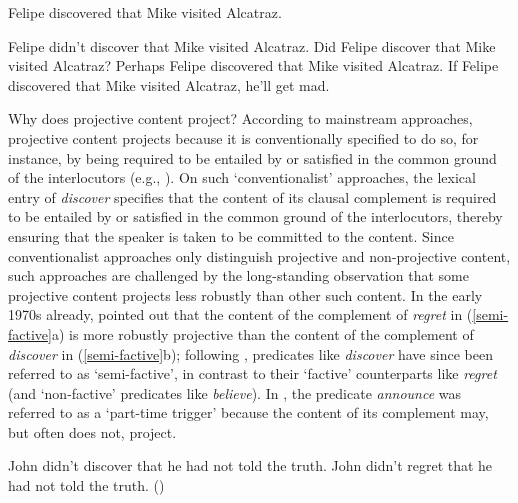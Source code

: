 \documentclass[11pt,fleqn]{article}
\newcommand{\6}{\mbox{$[\hspace*{-.6mm}[$}}
\newcommand{\9}{\mbox{$]\hspace*{-.6mm}]$}}
\begin{document}
\begin{exe}
\ex\label{eng1}  Felipe discovered that Mike visited Alcatraz.

\ex\label{eng2}
\begin{xlist} 
\ex Felipe didn't discover that Mike visited Alcatraz.
\ex Did Felipe discover that Mike visited Alcatraz?
\ex Perhaps Felipe discovered that Mike visited Alcatraz.
\ex If Felipe discovered that Mike visited Alcatraz, he'll get mad.
\end{xlist}
\end{exe}

Why does projective content project? According to mainstream approaches, projective content projects because it is conventionally specified to do so, for instance, by being required to be entailed by or satisfied in the common ground of the interlocutors (e.g., \citealt{heim83,vds92,geurts99}). On such `conventionalist' approaches, the lexical entry of {\em discover} specifies that the content of its clausal complement is required to be entailed by or satisfied in the common ground of the interlocutors, thereby ensuring that the speaker is taken to be committed to the content. Since conventionalist approaches only distinguish projective and non-projective content, such approaches are challenged by the long-standing observation that some projective content projects less robustly than other such content. In the early 1970s already, \citet{karttunen71b} pointed out that the content of the complement of {\em regret} in (\ref{semi-factive}a) is more robustly projective than the content of the complement of {\em discover} in (\ref{semi-factive}b); following \citealt{karttunen71b}, predicates like {\em discover} have since been referred to as `semi-factive', in contrast to their `factive' counterparts like {\em regret} (and `non-factive' predicates like {\em believe}). In \citealt{schlenker10}, the predicate {\em announce} was referred to as a `part-time trigger' because the content of its complement may, but often does not, project.

\begin{exe}
\ex\label{semi-factive}
\begin{xlist}
\ex John didn't discover that he had not told the truth.  
\ex John didn't regret that he had not told the truth.
\hfill (\citealt[63]{karttunen71b})

\end{xlist}
\end{exe}
\end{document}
